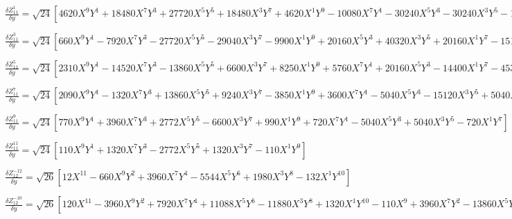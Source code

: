 \documentclass[10pt,landscape]{article}
\begin{document}
\vspace{1.2 mm}
\noindent $ \frac{\delta Z^{1}_{11}}{\delta y} = \sqrt{24} [4620X^{9}Y^{1} +18480X^{7}Y^{3} +27720X^{5}Y^{5} +18480X^{3}Y^{7} +4620X^{1}Y^{9} -10080X^{7}Y^{1} -30240X^{5}Y^{3} -30240X^{3}Y^{5} -10080X^{1}Y^{7} +7560X^{5}Y^{1} +15120X^{3}Y^{3} +7560X^{1}Y^{5} -2240X^{3}Y^{1} -2240X^{1}Y^{3} +210X^{1}Y^{1}] $

\vspace{1.2 mm}
\noindent $ \frac{\delta Z^{3}_{11}}{\delta y} = \sqrt{24} [660X^{9}Y^{1} -7920X^{7}Y^{3} -27720X^{5}Y^{5} -29040X^{3}Y^{7} -9900X^{1}Y^{9} +20160X^{5}Y^{3} +40320X^{3}Y^{5} +20160X^{1}Y^{7} -1512X^{5}Y^{1} -15120X^{3}Y^{3} -13608X^{1}Y^{5} +1120X^{3}Y^{1} +3360X^{1}Y^{3} -210X^{1}Y^{1}] $

\vspace{1.2 mm}
\noindent $ \frac{\delta Z^{5}_{11}}{\delta y} = \sqrt{24} [2310X^{9}Y^{1} -14520X^{7}Y^{3} -13860X^{5}Y^{5} +6600X^{3}Y^{7} +8250X^{1}Y^{9} +5760X^{7}Y^{1} +20160X^{5}Y^{3} -14400X^{1}Y^{7} -4536X^{5}Y^{1} -5040X^{3}Y^{3} +7560X^{1}Y^{5} +1120X^{3}Y^{1} -1120X^{1}Y^{3}] $

\vspace{1.2 mm}
\noindent $ \frac{\delta Z^{7}_{11}}{\delta y} = \sqrt{24} [2090X^{9}Y^{1} -1320X^{7}Y^{3} +13860X^{5}Y^{5} +9240X^{3}Y^{7} -3850X^{1}Y^{9} +3600X^{7}Y^{1} -5040X^{5}Y^{3} -15120X^{3}Y^{5} +5040X^{1}Y^{7} -1512X^{5}Y^{1} +5040X^{3}Y^{3} -1512X^{1}Y^{5}] $

\vspace{1.2 mm}
\noindent $ \frac{\delta Z^{9}_{11}}{\delta y} = \sqrt{24} [770X^{9}Y^{1} +3960X^{7}Y^{3} +2772X^{5}Y^{5} -6600X^{3}Y^{7} +990X^{1}Y^{9} +720X^{7}Y^{1} -5040X^{5}Y^{3} +5040X^{3}Y^{5} -720X^{1}Y^{7}] $

\vspace{1.2 mm}
\noindent $ \frac{\delta Z^{11}_{11}}{\delta y} = \sqrt{24} [110X^{9}Y^{1} +1320X^{7}Y^{3} -2772X^{5}Y^{5} +1320X^{3}Y^{7} -110X^{1}Y^{9}] $

\vspace{1.2 mm}
\noindent $ \frac{\delta Z^{-12}_{12}}{\delta y} = \sqrt{26} [12X^{11} -660X^{9}Y^{2} +3960X^{7}Y^{4} -5544X^{5}Y^{6} +1980X^{3}Y^{8} -132X^{1}Y^{10}] $

\vspace{1.2 mm}
\noindent $ \frac{\delta Z^{-10}_{12}}{\delta y} = \sqrt{26} [120X^{11} -3960X^{9}Y^{2} +7920X^{7}Y^{4} +11088X^{5}Y^{6} -11880X^{3}Y^{8} +1320X^{1}Y^{10} -110X^{9} +3960X^{7}Y^{2} -13860X^{5}Y^{4} +9240X^{3}Y^{6} -990X^{1}Y^{8}] $
\end{document}
